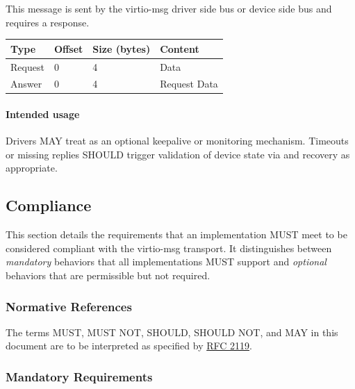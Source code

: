 
This message is sent by the virtio-msg driver side bus or device side bus and
requires a response.

\begin{tabular}{|l|l|l|l|}
\hline
Type & Offset & Size (bytes) & Content \\
 \hline \hline
Request & 0 & 4 & Data \\
\hline
Answer & 0 & 4 & Request Data \\
\hline
\end{tabular}

\paragraph{Intended usage}
Drivers MAY treat  as an optional keepalive or monitoring
mechanism. Timeouts or missing replies SHOULD trigger validation of device
state via  and recovery as appropriate.

\subsection{Compliance}
\label{sec:Virtio Transport Options / Virtio Over Messages / Compliance}

This section details the requirements that an implementation MUST meet to
be considered compliant with the virtio-msg transport. It distinguishes between
\emph{mandatory} behaviors that all implementations MUST support and
\emph{optional} behaviors that are permissible but not required.

\subsubsection{Normative References}
\label{sec:Virtio Transport Options / Virtio Over Messages / Compliance / NormativeRefs}
The terms MUST, MUST NOT, SHOULD, SHOULD NOT,
and MAY in this document are to be interpreted as specified by
\href{https://www.rfc-editor.org/rfc/rfc2119}{RFC 2119}.

\subsubsection{Mandatory Requirements}
\label{sec:Virtio Transport Options / Virtio Over Messages / Compliance / Mandatory}

